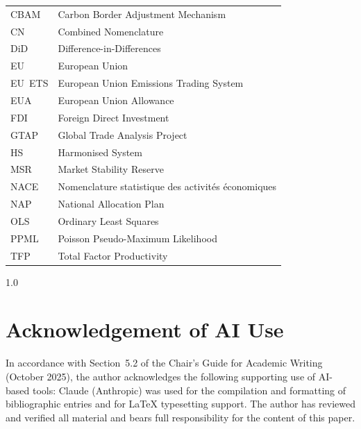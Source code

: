 \documentclass[12pt,a4paper]{article}
\numberwithin{equation}{section}
\begin{document}
\begin{tabular}{@{}ll@{}}
CBAM   & Carbon Border Adjustment Mechanism \\
CN     & Combined Nomenclature \\
DiD    & Difference-in-Differences \\
EU     & European Union \\
EU~ETS & European Union Emissions Trading System \\
EUA    & European Union Allowance \\
FDI    & Foreign Direct Investment \\
GTAP   & Global Trade Analysis Project \\
HS     & Harmonised System \\
MSR    & Market Stability Reserve \\
NACE   & Nomenclature statistique des activit\'{e}s \'{e}conomiques \\
NAP    & National Allocation Plan \\
OLS    & Ordinary Least Squares \\
PPML   & Poisson Pseudo-Maximum Likelihood \\
TFP    & Total Factor Productivity \\
\end{tabular}

\newpage
{}








\newpage
{}
\begin{spacing}{1.0}
\setlength{\bibsep}{0.9\baselineskip}
\raggedright

\end{spacing}

\newpage
\section*{Acknowledgement of AI Use}

In accordance with Section~5.2 of the Chair's Guide for Academic Writing (October 2025), the author acknowledges the following supporting use of AI-based tools: Claude (Anthropic) was used for the compilation and formatting of bibliographic entries and for LaTeX typesetting support. The author has reviewed and verified all material and bears full responsibility for the content of this paper.
\end{document}
